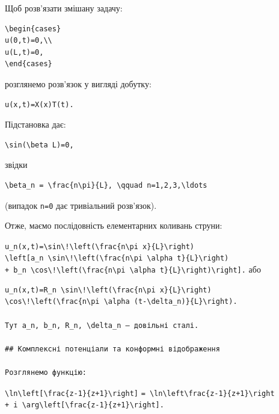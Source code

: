 \documentclass[
  ukrainian,
]{article}
\begin{document}
Щоб розв'язати змішану задачу:

\begin{verbatim}
\begin{cases}
u(0,t)=0,\\
u(L,t)=0,
\end{cases}
\end{verbatim}

розглянемо розв'язок у вигляді добутку:

\begin{verbatim}
u(x,t)=X(x)T(t).
\end{verbatim}

Підстановка дає:

\begin{verbatim}
\sin(\beta L)=0,
\end{verbatim}

звідки

\begin{verbatim}
\beta_n = \frac{n\pi}{L}, \qquad n=1,2,3,\ldots
\end{verbatim}

(випадок \texttt{n=0} дає тривіальний розв'язок).

Отже, маємо послідовність елементарних коливань струни:

\texttt{u\_n(x,t)=\textbackslash{}sin\textbackslash{}!\textbackslash{}left(\textbackslash{}frac\{n\textbackslash{}pi\ x\}\{L\}\textbackslash{}right)}
\texttt{\textbackslash{}left{[}a\_n\ \textbackslash{}sin\textbackslash{}!\textbackslash{}left(\textbackslash{}frac\{n\textbackslash{}pi\ \textbackslash{}alpha\ t\}\{L\}\textbackslash{}right)}
\texttt{+\ b\_n\ \textbackslash{}cos\textbackslash{}!\textbackslash{}left(\textbackslash{}frac\{n\textbackslash{}pi\ \textbackslash{}alpha\ t\}\{L\}\textbackslash{}right)\textbackslash{}right{]}.}
або

\begin{verbatim}
u_n(x,t)=R_n \sin\!\left(\frac{n\pi x}{L}\right)
\cos\!\left(\frac{n\pi \alpha (t-\delta_n)}{L}\right).

Тут a_n, b_n, R_n, \delta_n — довільні сталі.

## Комплексні потенціали та конформні відображення

Розглянемо функцію:
\end{verbatim}

\texttt{\textbackslash{}ln\textbackslash{}left{[}\textbackslash{}frac\{z-1\}\{z+1\}\textbackslash{}right{]}}
\texttt{=\ \textbackslash{}ln\textbackslash{}left\textbar{}\textbackslash{}frac\{z-1\}\{z+1\}\textbackslash{}right\textbar{}}
\texttt{+\ i\ \textbackslash{}arg\textbackslash{}left{[}\textbackslash{}frac\{z-1\}\{z+1\}\textbackslash{}right{]}.}
\end{document}
